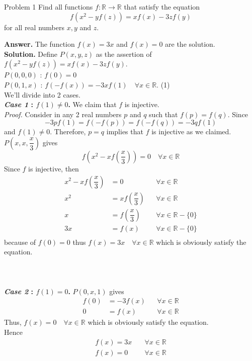 \documentclass[12pt]{article}
\begin{document}
\begin{mybox}{Problem 1}
Find all functions $f : \mathbb{R} \rightarrow \mathbb{R}$  that satisfy the equation $$f(x^2-yf(z))=xf(x)-3zf(y)$$ for all real numbers $x,y$ and $z$.
\end{mybox}
\textbf{Answer.} The function $f(x)=3x$ and $f(x)=0$ are the solution.\\
\textbf{Solution.} Define $P(x,y,z)$ as the assertion of $f(x^2-yf(z))=xf(x)-3zf(y)$. \\
$P(0,0,0)$ : $f(0)=0$ \\ 
$P(0,1,x)$ : $f(-f(x))=-3xf(1) \quad \forall x \in \mathbb{R}$. 
\null\hfill (1)
\\     We'll divide into 2 cases.\\
\textbf{\emph{Case 1} : $f(1) \neq 0$.} We claim that $f$ is injective.\\
\emph{Proof.} Consider in any 2 real numbers $p$ and $q$ such that $f(p)=f(q)$. Since $$-3pf(1)=f(-f(p))=f(-f(q))=-3qf(1)$$ and $f(1) \neq 0$. Therefore, $p=q$ implies that $f$ is injective as we claimed.\\
$P(x,x,\dfrac{x}{3})$ gives $$f(x^2-xf(\dfrac{x}{3}))=0 \quad \forall x \in \mathbb{R}$$ Since $f$ is injective, then
\begin{align*} 
x^2-xf(\dfrac{x}{3}) 	&=0  &&\forall x \in \mathbb{R} \\
x^2 								 & = xf(\dfrac{x}{3}) &&\forall x \in \mathbb{R}\\
x 	&= f(\dfrac{x}{3})   &&\forall x \in \mathbb{R} - \{0\} \\
3x &= f(x)  &&\forall x \in \mathbb{R} - \{0\}\\
\end{align*}
because of $f(0)=0$ thus $f(x)=3x \quad \forall x \in \mathbb{R}$ which is obviously satisfy the equation. \\ \\ \\ \\
\textbf{\emph{Case 2} : $f(1) = 0$.} $P(0,x,1)$ gives
\begin{align*} 
f(0) 	&=-3f(x)  &&\forall x \in \mathbb{R} \\
0&=f(x) &&\forall x \in \mathbb{R} 
\end{align*}
Thus, $f(x)=0 \quad \forall x \in \mathbb{R} $ which is obviously satisfy the equation.\\
Hence 
\begin{align*}
f(x)=3x \quad& \forall x \in \mathbb{R} \\ 
f(x)=0 \quad & \forall x \in \mathbb{R}
\end{align*}
\end{document}
